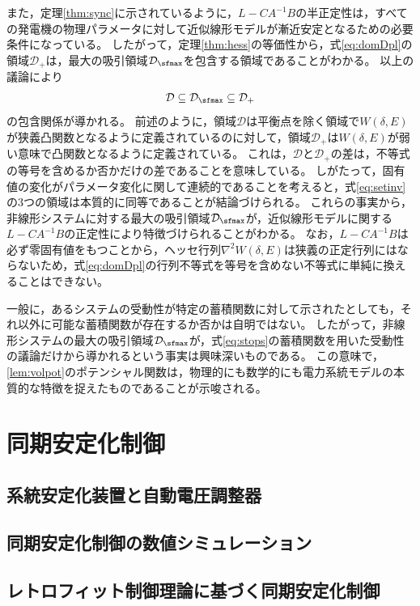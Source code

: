 \documentclass[tombow,dvipdfmx]{corona-a5}
\begin{document}
また，定理\ref{thm:sync}に示されているように，$L-CA^{-1}B$の半正定性は，すべての発電機の物理パラメータに対して近似線形モデルが漸近安定となるための必要条件になっている。
したがって，定理\ref{thm:hess}の等価性から，式\ref{eq:domDpl}の領域$\mathcal{D}_{+}$は，最大の吸引領域$\mathcal{D}_{\sfmax}$を包含する領域であることがわかる。
以上の議論により
\begin{align}\label{eq:setinv}
\mathcal{D} \subseteq \mathcal{D}_{\sfmax} \subseteq \mathcal{D}_{+}
\end{align}
の包含関係が導かれる。
前述のように，領域$\mathcal{D}$は平衡点を除く領域で$W(\delta,E)$が狭義凸関数となるように定義されているのに対して，領域$\mathcal{D}_{+}$は$W(\delta,E)$が弱い意味で凸関数となるように定義されている。
これは，$\mathcal{D}$と$\mathcal{D}_{+}$の差は，不等式の等号を含めるか否かだけの差であることを意味している。
しがたって，固有値の変化がパラメータ変化に関して連続的であることを考えると，式\ref{eq:setinv}の3つの領域は本質的に同等であることが結論づけられる。
これらの事実から，非線形システムに対する最大の吸引領域$\mathcal{D}_{\sfmax}$が，近似線形モデルに関する$L-CA^{-1}B$の正定性により特徴づけられることがわかる。
なお，$L-CA^{-1}B$は必ず零固有値をもつことから，ヘッセ行列$\nabla^2 W(\delta,E)$は狭義の正定行列にはならないため，式\ref{eq:domDpl}の行列不等式を等号を含めない不等式に単純に換えることはできない。

一般に，あるシステムの受動性が特定の蓄積関数に対して示されたとしても，それ以外に可能な蓄積関数が存在するか否かは自明ではない。
したがって，非線形システムの最大の吸引領域$\mathcal{D}_{\sfmax}$が，式\ref{eq:stops}の蓄積関数を用いた受動性の議論だけから導かれるという事実は興味深いものである。
この意味で，\ref{lem:volpot}のポテンシャル関数は，物理的にも数学的にも電力系統モデルの本質的な特徴を捉えたものであることが示唆される。


\section{同期安定化制御}
\subsection{系統安定化装置と自動電圧調整器}
\subsection{同期安定化制御の数値シミュレーション}
\subsection{レトロフィット制御理論に基づく同期安定化制御\advanced}


\newpage
%
%
\end{document}
